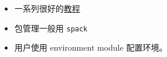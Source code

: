 
\begin{issues}
\issueDraft
\end{issues}

\begin{itemize}
\item 一系列很好的\href{https://hpc-tutorials.llnl.gov/}{教程}
\item 包管理一般用 \verb|spack|
\item 用户使用 environment module 配置环境。
\end{itemize}
